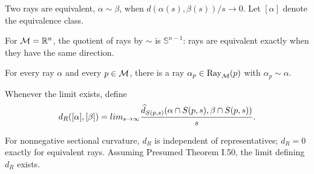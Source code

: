 \begin{definition}
\label{def:chow-iii-i51-ray-equivalence}
Two rays are equivalent, $\alpha\sim\beta$, when
$d(\alpha(s),\beta(s))/s\to0$.  Let $[\alpha]$ denote the equivalence class.
\end{definition}

\begin{example}
\label{ex:chow-iii-i51-euclidean-boundary}
For $\mathcal M=\mathbb R^n$, the quotient of rays by $\sim$ is $\mathbb S^{n-1}$: rays are
equivalent exactly when they have the same direction.
\end{example}

\begin{lemma}
\label{lem:chow-iii-i52-rays-at-basepoint}

For every ray $\alpha$ and every $p\in\mathcal M$, there is a ray $\alpha_p\in\operatorname{Ray}_{\mathcal M}(p)$
with $\alpha_p\sim\alpha$.
\end{lemma}

\begin{definition}
\label{def:chow-iii-i53-ray-distance}

Whenever the limit exists, define
\[
d_R([\alpha],[\beta])=lim_{s\to\infty}
\frac{\widehat d_{S(p,s)}(\alpha\cap S(p,s),\beta\cap S(p,s))}{s}.
\]
\end{definition}

\begin{lemma}
\label{lem:chow-iii-i53-ray-distance-well-defined}

For nonnegative sectional curvature, $d_R$ is independent of representatives;
$d_R=0$ exactly for equivalent rays.  Assuming Presumed Theorem I.50, the
limit defining $d_R$ exists.
\end{lemma}

